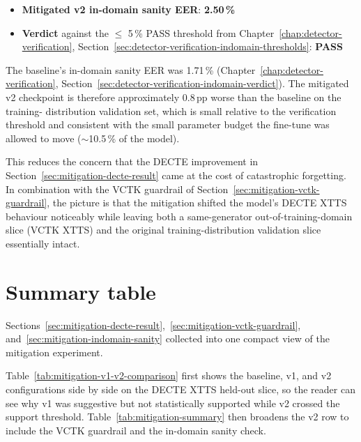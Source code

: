 \begin{itemize}
    \item \textbf{Mitigated v2 in-domain sanity EER}: \textbf{2.50\,\%}
    \item \textbf{Verdict} against the $\leq$ 5\,\% PASS threshold from Chapter~\ref{chap:detector-verification},
        Section~\ref{sec:detector-verification-indomain-thresholds}: \textbf{PASS}
\end{itemize}

The baseline's in-domain sanity EER was 1.71\,\% (Chapter~\ref{chap:detector-verification},
Section~\ref{sec:detector-verification-indomain-verdict}). The mitigated v2 checkpoint is therefore
approximately 0.8\,pp worse than the baseline on the training-%
distribution validation set, which is small relative to the
verification threshold and consistent with the small parameter
budget the fine-tune was allowed to move ($\sim$10.5\,\% of the model).

This reduces the concern that the DECTE improvement in Section~\ref{sec:mitigation-decte-result}
came at the cost of catastrophic forgetting. In combination with
the VCTK guardrail of Section~\ref{sec:mitigation-vctk-guardrail}, the picture is that the
mitigation shifted the model's DECTE XTTS behaviour noticeably
while leaving both a same-generator out-of-training-domain slice
(VCTK XTTS) and the original training-distribution validation
slice essentially intact.


\section{Summary table}
\label{sec:mitigation-summary-table}

Sections~\ref{sec:mitigation-decte-result},~\ref{sec:mitigation-vctk-guardrail}, and~\ref{sec:mitigation-indomain-sanity} collected into one compact view of
the mitigation experiment.

Table~\ref{tab:mitigation-v1-v2-comparison} first shows the baseline, v1, and
v2 configurations side by side on the DECTE XTTS held-out slice, so the reader
can see why v1 was suggestive but not statistically supported while v2 crossed
the support threshold. Table~\ref{tab:mitigation-summary} then broadens the v2
row to include the VCTK guardrail and the in-domain sanity check.

